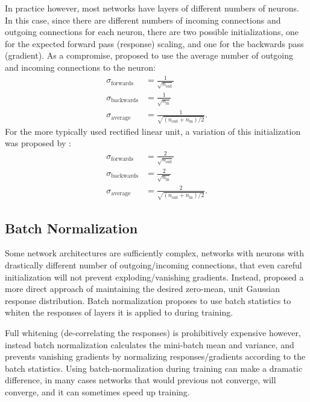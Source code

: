 \documentclass[thesis]{subfiles}
\begin{document}
In practice however, most networks have layers of different numbers of neurons. In this case, since there are different numbers of incoming connections and outgoing connections for each neuron, there are two possible initializations, one for the expected forward pass (response) scaling, and one for the backwards pass (gradient). As a compromise, \citet{glorot2010understanding} proposed to use the average number of outgoing and incoming connections to the neuron:
%
\begin{equation}
\begin{aligned}
	\sigma_{\textrm{forwards}} &= \frac{1}{\sqrt{n_{\text{out}}}}\\
	\sigma_{\textrm{backwards}} &= \frac{1}{\sqrt{n_{\text{in}}}}\\
	\sigma_{\textrm{average}} &= \frac{1}{\sqrt{(n_{\text{out}} + n_{\text{in}})/2}}.
\end{aligned}
\end{equation}
%
For the more typically used rectified linear unit, a variation of this initialization was proposed by \citet{He2015b}:
%
\begin{equation}
\begin{aligned}
	\sigma_{\textrm{forwards}} &= \frac{2}{\sqrt{n_{\text{out}}}}\\
	\sigma_{\textrm{backwards}} &= \frac{2}{\sqrt{n_{\text{in}}}}\\
	\sigma_{\textrm{average}} &= \frac{2}{\sqrt{(n_{\text{out}} + n_{\text{in}})/2}}.
\end{aligned}
\end{equation}
%
\subsection{Batch Normalization}
Some network architectures are sufficiently complex, \ie networks with neurons with drastically different number of outgoing/incoming connections, that even careful initialization will not prevent exploding/vanishing gradients. Instead, \citet{Ioffe2015} proposed a more direct approach of maintaining the desired zero-mean, unit Gaussian response distribution. Batch normalization proposes to use batch statistics to whiten the responses of layers it is applied to during training.

Full whitening (\ie de-correlating the responses) is prohibitively expensive however, instead batch normalization calculates the mini-batch mean and variance, and prevents vanishing gradients by normalizing responses/gradients according to the batch statistics. Using batch-normalization during training can make a dramatic difference, in many cases networks that would previous not converge, will converge, and it can sometimes speed up training.
\end{document}
